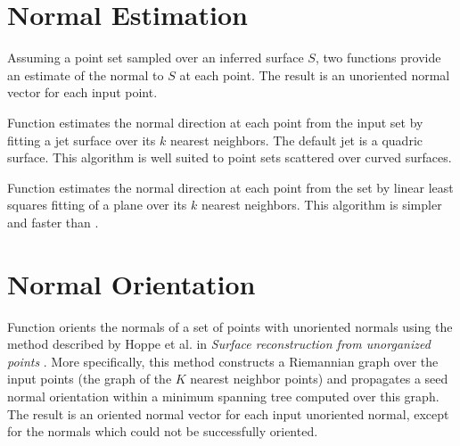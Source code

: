 \section{Normal Estimation}

Assuming a point set sampled over an inferred surface $S$, two functions provide an estimate of the normal to $S$ at each point. The result is an unoriented normal vector for each input point.

Function  estimates the normal direction at each point from the input set by fitting a jet surface over its $k$ nearest neighbors. The default jet is a quadric surface. This algorithm is well suited to point sets scattered over curved surfaces.

Function  estimates the normal direction at each point from the set by linear least squares fitting of a plane over its $k$ nearest neighbors. This algorithm is simpler and faster than .


\section{Normal Orientation}

Function  orients the normals of a set of points with unoriented normals using the method described by Hoppe et al. in \emph{Surface reconstruction from unorganized points} \cite{cgal:hddms-srup-92}. More specifically, this method constructs a Riemannian graph over the input points (the graph of the $K$ nearest neighbor points) and propagates a seed normal orientation within a minimum spanning tree computed over this graph. The result is an oriented normal vector for each input unoriented normal, except for the normals which could not be successfully oriented. 

